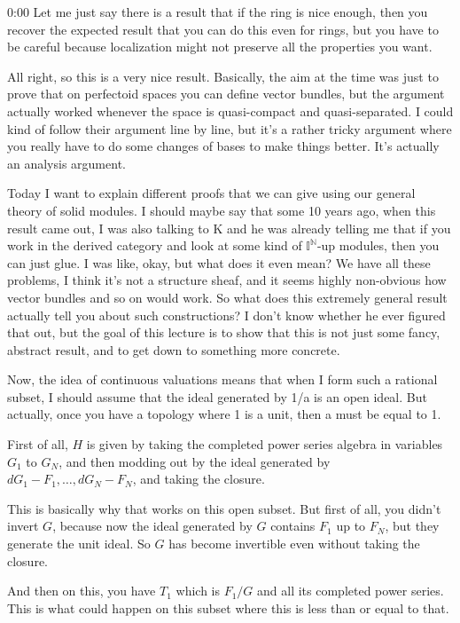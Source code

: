 \begin{unfinished}{0:00}
Let me just say there is a result that if the ring is nice enough, then you recover the expected result that you can do this even for rings, but you have to be careful because localization might not preserve all the properties you want.

All right, so this is a very nice result. Basically, the aim at the time was just to prove that on perfectoid spaces you can define vector bundles, but the argument actually worked whenever the space is quasi-compact and quasi-separated. I could kind of follow their argument line by line, but it's a rather tricky argument where you really have to do some changes of bases to make things better. It's actually an analysis argument.

Today I want to explain different proofs that we can give using our general theory of solid modules. I should maybe say that some 10 years ago, when this result came out, I was also talking to K and he was already telling me that if you work in the derived category and look at some kind of $\mathbb{I}^{\mathbb{N}}$-up modules, then you can just glue. I was like, okay, but what does it even mean? We have all these problems, I think it's not a structure sheaf, and it seems highly non-obvious how vector bundles and so on would work. So what does this extremely general result actually tell you about such constructions? I don't know whether he ever figured that out, but the goal of this lecture is to show that this is not just some fancy, abstract result, and to get down to something more concrete.

Now, the idea of continuous valuations means that when I form such a rational subset, I should assume that the ideal generated by 1/a is an open ideal. But actually, once you have a topology where 1 is a unit, then a must be equal to 1.

First of all, $H$ is given by taking the completed power series algebra in variables $G_1$ to $G_N$, and then modding out by the ideal generated by $dG_1 - F_1, \dots, dG_N - F_N$, and taking the closure.

This is basically why that works on this open subset. But first of all, you didn't invert $G$, because now the ideal generated by $G$ contains $F_1$ up to $F_N$, but they generate the unit ideal. So $G$ has become invertible even without taking the closure.

And then on this, you have $T_1$ which is $F_1/G$ and all its completed power series. This is what could happen on this subset where this is less than or equal to that.


\end{unfinished}
